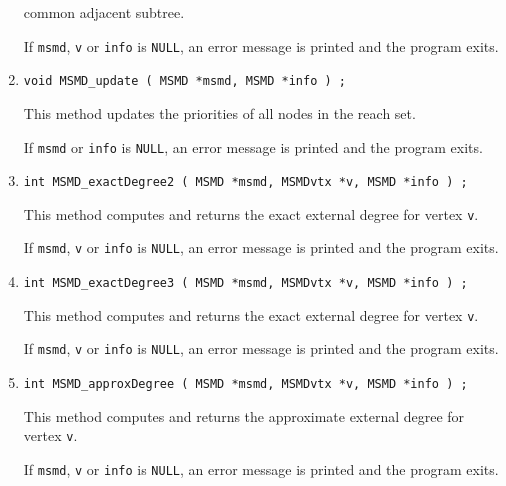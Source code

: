 \begin{enumerate}
common adjacent subtree.
\par {}
If {\tt msmd}, {\tt v} or {\tt info} is {\tt NULL},
an error message is printed and the program exits.
\item
\begin{verbatim}
void MSMD_update ( MSMD *msmd, MSMD *info ) ;
\end{verbatim}
This method updates the priorities of all nodes in the reach set.
\par {}
If {\tt msmd} or {\tt info} is {\tt NULL},
an error message is printed and the program exits.
\item
\begin{verbatim}
int MSMD_exactDegree2 ( MSMD *msmd, MSMDvtx *v, MSMD *info ) ;
\end{verbatim}
This method computes and returns the exact external degree 
for vertex {\tt v}.
\par {}
If {\tt msmd}, {\tt v} or {\tt info} is {\tt NULL},
an error message is printed and the program exits.
\item
\begin{verbatim}
int MSMD_exactDegree3 ( MSMD *msmd, MSMDvtx *v, MSMD *info ) ;
\end{verbatim}
This method computes and returns the exact external degree 
for vertex {\tt v}.
\par {}
If {\tt msmd}, {\tt v} or {\tt info} is {\tt NULL},
an error message is printed and the program exits.
\item
\begin{verbatim}
int MSMD_approxDegree ( MSMD *msmd, MSMDvtx *v, MSMD *info ) ;
\end{verbatim}
This method computes and returns the approximate external degree 
for vertex {\tt v}.
\par {}
If {\tt msmd}, {\tt v} or {\tt info} is {\tt NULL},
an error message is printed and the program exits.

\end{enumerate}
